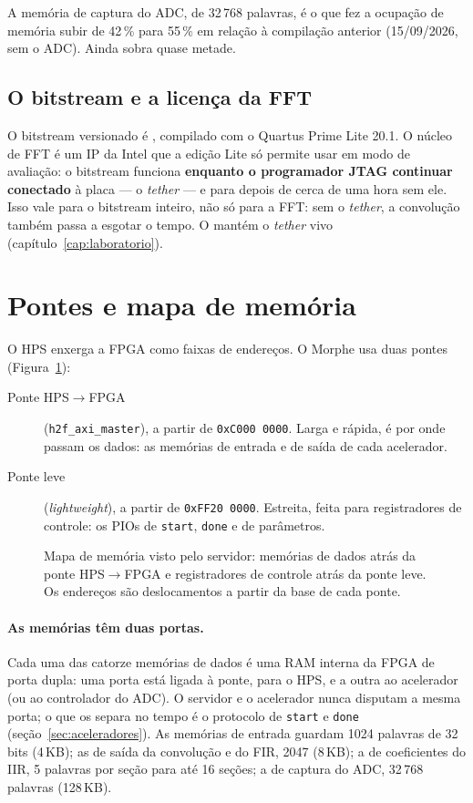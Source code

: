 A memória de captura do ADC, de 32\,768 palavras, é o que fez a ocupação de
memória subir de 42\,\% para 55\,\% em relação à compilação anterior (15/09/2026,
sem o ADC). Ainda sobra quase metade.

\subsection*{O bitstream e a licença da FFT}

O bitstream versionado é ,
compilado com o Quartus Prime Lite 20.1. O núcleo de FFT é um IP da Intel que a
edição Lite só permite usar em modo de avaliação: o bitstream funciona
\textbf{enquanto o programador JTAG continuar conectado} à placa --- o
\emph{tether} --- e para depois de cerca de uma hora sem ele. Isso vale para o
bitstream inteiro, não só para a FFT: sem o \emph{tether}, a convolução também
passa a esgotar o tempo. O  mantém o \emph{tether} vivo
(capítulo~\ref{cap:laboratorio}).

\section{Pontes e mapa de memória}
\label{sec:pontes}

O HPS enxerga a FPGA como faixas de endereços. O Morphe usa duas pontes
(Figura~\ref{fig:mapa-memoria}):

\begin{description}
  \item[Ponte HPS\(\to\)FPGA] (\texttt{h2f\_axi\_master}), a partir de
    \texttt{0xC000\,0000}. Larga e rápida, é por onde passam os dados: as
    memórias de entrada e de saída de cada acelerador.
  \item[Ponte leve] (\emph{lightweight}), a partir de \texttt{0xFF20\,0000}.
    Estreita, feita para registradores de controle: os PIOs de
    \texttt{start}, \texttt{done} e de parâmetros.
\end{description}

\begin{figure}[htbp]
  \centering
  \caption{Mapa de memória visto pelo servidor: memórias de dados atrás da
    ponte HPS\(\to\)FPGA e registradores de controle atrás da ponte leve.
    Os endereços são deslocamentos a partir da base de cada ponte.}
  \label{fig:mapa-memoria}
\end{figure}

\paragraph{As memórias têm duas portas.} Cada uma das catorze memórias de dados
é uma RAM interna da FPGA de porta dupla: uma porta está ligada à ponte, para o
HPS, e a outra ao acelerador (ou ao controlador do ADC). O servidor e o acelerador nunca disputam a mesma
porta; o que os separa no tempo é o protocolo de \texttt{start} e \texttt{done}
(seção~\ref{sec:aceleradores}). As memórias de entrada guardam 1024 palavras de
32 bits (4\,KB); as de saída da convolução e do FIR, 2047 (8\,KB); a de
coeficientes do IIR, 5 palavras por seção para até 16 seções; a de captura do
ADC, 32\,768 palavras (128\,KB).

